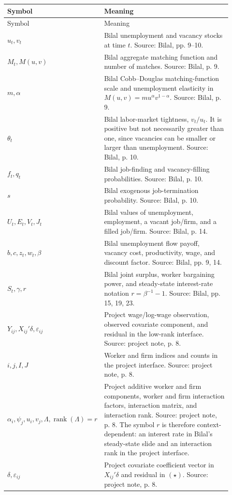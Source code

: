 ﻿\documentclass[11pt]{article}
\newcommand{\1}{\mathbf{1}}
\begin{document}
\begin{longtable}{>{\raggedright\arraybackslash}p{0.24\linewidth}
                >{\raggedright\arraybackslash}p{0.68\linewidth}}
\toprule
Symbol & Meaning \\
\midrule
\endfirsthead
\toprule
Symbol & Meaning \\
\midrule
\endhead
$u_t,v_t$ & Bilal unemployment and vacancy stocks at time $t$. Source: Bilal, pp. 9--10. \\
$M_t,M(u,v)$ & Bilal aggregate matching function and number of matches. Source: Bilal, p. 9. \\
$m,\alpha$ & Bilal Cobb--Douglas matching-function scale and unemployment elasticity in $M(u,v)=mu^\alpha v^{1-\alpha}$. Source: Bilal, p. 9. \\
$\theta_t$ & Bilal labor-market tightness, $v_t/u_t$. It is positive but not necessarily greater than one, since vacancies can be smaller or larger than unemployment. Source: Bilal, p. 10. \\
$f_t,q_t$ & Bilal job-finding and vacancy-filling probabilities. Source: Bilal, p. 10. \\
$s$ & Bilal exogenous job-termination probability. Source: Bilal, p. 10. \\
$U_t,E_t,V_t,J_t$ & Bilal values of unemployment, employment, a vacant job/firm, and a filled job/firm. Source: Bilal, p. 14. \\
$b,c,z_t,w_t,\beta$ & Bilal unemployment flow payoff, vacancy cost, productivity, wage, and discount factor. Source: Bilal, pp. 9, 14. \\
$S_t,\gamma,r$ & Bilal joint surplus, worker bargaining power, and steady-state interest-rate notation $r=\beta^{-1}-1$. Source: Bilal, pp. 15, 19, 23. \\
$Y_{ij},X_{ij}'\delta,\varepsilon_{ij}$ & Project wage/log-wage observation, observed covariate component, and residual in the low-rank interface. Source: project note, p. 8. \\
$i,j,I,J$ & Worker and firm indices and counts in the project interface. Source: project note, p. 8. \\
$\alpha_i,\psi_j,u_i,v_j,\Lambda,\operatorname{rank}(\Lambda)=r$ & Project additive worker and firm components, worker and firm interaction factors, interaction matrix, and interaction rank. Source: project note, p. 8. The symbol $r$ is therefore context-dependent: an interest rate in Bilal's steady-state slide and an interaction rank in the project interface. \\
$\delta,\varepsilon_{ij}$ & Project covariate coefficient vector in $X_{ij}'\delta$ and residual in $(\star)$. Source: project note, p. 8. \\

\end{longtable}
\end{document}
